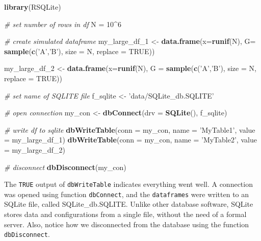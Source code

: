 \documentclass[
  12pt,
]{book}
\newenvironment{Shaded}{\begin{snugshade}}{\end{snugshade}}
\newcommand{\CommentTok}[1]{\textcolor[rgb]{0.37,0.37,0.37}{\textit{#1}}}
\newcommand{\DataTypeTok}[1]{\textcolor[rgb]{0.27,0.27,0.27}{#1}}
\newcommand{\DecValTok}[1]{\textcolor[rgb]{0.06,0.06,0.06}{#1}}
\newcommand{\KeywordTok}[1]{\textcolor[rgb]{0.27,0.27,0.27}{\textbf{#1}}}
\newcommand{\NormalTok}[1]{#1}
\newcommand{\OperatorTok}[1]{\textcolor[rgb]{0.43,0.43,0.43}{\textbf{#1}}}
\newcommand{\OtherTok}[1]{\textcolor[rgb]{0.37,0.37,0.37}{#1}}
\newcommand{\StringTok}[1]{\textcolor[rgb]{0.5,0.5,0.5}{#1}}
\begin{document}
\begin{Shaded}
\begin{Highlighting}[]
\KeywordTok{library}\NormalTok{(RSQLite)}

\CommentTok{# set number of rows in df}
\NormalTok{N =}\StringTok{ }\DecValTok{10}\OperatorTok{^}\DecValTok{6} 

\CommentTok{# create simulated dataframe}
\NormalTok{my_large_df_}\DecValTok{1}\NormalTok{ <-}\StringTok{ }\KeywordTok{data.frame}\NormalTok{(}\DataTypeTok{x=}\KeywordTok{runif}\NormalTok{(N), }
                            \DataTypeTok{G=} \KeywordTok{sample}\NormalTok{(}\KeywordTok{c}\NormalTok{(}\StringTok{'A'}\NormalTok{,}\StringTok{'B'}\NormalTok{),}
                                      \DataTypeTok{size =}\NormalTok{ N,}
                                      \DataTypeTok{replace =} \OtherTok{TRUE}\NormalTok{))}

\NormalTok{my_large_df_}\DecValTok{2}\NormalTok{ <-}\StringTok{ }\KeywordTok{data.frame}\NormalTok{(}\DataTypeTok{x=}\KeywordTok{runif}\NormalTok{(N), }
                            \DataTypeTok{G =} \KeywordTok{sample}\NormalTok{(}\KeywordTok{c}\NormalTok{(}\StringTok{'A'}\NormalTok{,}\StringTok{'B'}\NormalTok{),}
                                       \DataTypeTok{size =}\NormalTok{ N,}
                                       \DataTypeTok{replace =} \OtherTok{TRUE}\NormalTok{))}

\CommentTok{# set name of SQLITE file}
\NormalTok{f_sqlite <-}\StringTok{ 'data/SQLite_db.SQLITE'}

\CommentTok{# open connection}
\NormalTok{my_con <-}\StringTok{ }\KeywordTok{dbConnect}\NormalTok{(}\DataTypeTok{drv =} \KeywordTok{SQLite}\NormalTok{(), f_sqlite)}

\CommentTok{# write df to sqlite}
\KeywordTok{dbWriteTable}\NormalTok{(}\DataTypeTok{conn =}\NormalTok{ my_con, }\DataTypeTok{name =} \StringTok{'MyTable1'}\NormalTok{, }
             \DataTypeTok{value =}\NormalTok{ my_large_df_}\DecValTok{1}\NormalTok{)}
\KeywordTok{dbWriteTable}\NormalTok{(}\DataTypeTok{conn =}\NormalTok{ my_con, }\DataTypeTok{name =} \StringTok{'MyTable2'}\NormalTok{, }
             \DataTypeTok{value =}\NormalTok{ my_large_df_}\DecValTok{2}\NormalTok{)}

\CommentTok{# disconnect}
\KeywordTok{dbDisconnect}\NormalTok{(my_con)}
\end{Highlighting}
\end{Shaded}

The \texttt{TRUE} output of \texttt{dbWriteTable} indicates everything went well. A connection was opened using function \texttt{dbConnect}, and the \texttt{dataframes} were written to an SQLite file, called SQLite\_db.SQLITE. Unlike other database software, SQLite stores data and configurations from a single file, without the need of a formal server. Also, notice how we disconnected from the database using the function \texttt{dbDisconnect}.   
\end{document}
